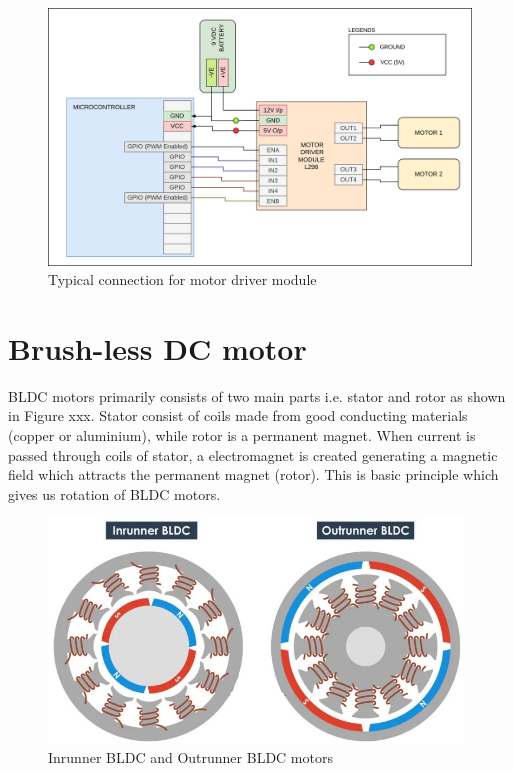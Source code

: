 \begin{figure}[h!]
\centering
\includegraphics[width=\columnwidth]{./Figures/Driver_module_connection.png}
\caption{Typical connection for motor driver module}
\label{Driver_module_connection}
\end{figure}

\newpage
\section{Brush-less DC motor}
\par BLDC motors primarily consists of two main parts i.e. stator and rotor as shown in Figure xxx. Stator consist of coils made from good conducting materials (copper or aluminium), while rotor is a permanent magnet. When current is passed through coils of stator, a electromagnet is created generating a magnetic field which attracts the permanent magnet (rotor). This is basic principle which gives us rotation of BLDC motors.

\begin{figure}[h!]
\centering
\includegraphics[width=11cm]{./Figures/BLDC_runner.jpg}
\caption{Inrunner BLDC and Outrunner BLDC motors}
\label{BLDC_runner}
\end{figure}

